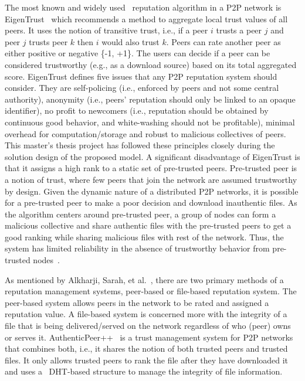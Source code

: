 The most known and widely used~\cite{chiluka2012personalizing} reputation
algorithm in a P2P network is EigenTrust~\cite{kamvar2003eigentrust} which
recommends a method to aggregate local trust values of all peers. It uses the
notion of transitive trust, i.e., if a peer $i$ trusts a peer $j$ and peer $j$
trusts peer $k$ then $i$ would also trust $k$. Peers can rate another peer as
either positive or negative \{-1, +1\}. The users can decide if a peer can be
considered trustworthy (e.g., as a download source) based on its total
aggregated score. EigenTrust defines five issues that any P2P reputation system
should consider. They are self-policing (i.e., enforced by peers and not some
central authority), anonymity (i.e., peers' reputation should only be linked to
an opaque identifier), no profit to newcomers (i.e., reputation should be
obtained by continuous good behavior, and white-washing should not be
profitable), minimal overhead for computation/storage and robust to malicious
collectives of peers. This master's thesis project has followed these
principles closely during the solution design of the proposed model. A
significant disadvantage of EigenTrust is that it assigns a high rank to a
static set of pre-trusted peers. Pre-trusted peer is a notion of trust, where
few peers that join the network are assumed trustworthy by design.  Given the
dynamic nature of a distributed P2P networks, it is possible for a pre-trusted
peer to make a poor decision and download inauthentic files. As the algorithm
centers around pre-trusted peer, a group of nodes can form a malicious
collective and share authentic files with the pre-trusted peers to get a good
ranking while sharing malicious files with rest of the network. Thus, the
system has limited reliability in the absence of trustworthy behavior from
pre-trusted nodes~\cite{chiluka2012personalizing}.\par

As mentioned by Alkharji, Sarah, et al.~\cite{alkharji2017authenticpeer++},
there are two primary methods of a reputation management systems, peer-based or
file-based reputation system. The peer-based system allows peers in the network
to be rated and assigned a reputation value. A file-based system is concerned
more with the integrity of a file that is being delivered/served on the network
regardless of who (peer) owns or serves it.
AuthenticPeer++~\cite{alkharji2017authenticpeer++} is a trust management system
for P2P networks that combines both, i.e., it shares the notion of both trusted
peers and trusted files. It only allows trusted peers to rank the file after
they have downloaded it and uses a ~\ac{DHT}-based structure to manage the
integrity of file information. \par

